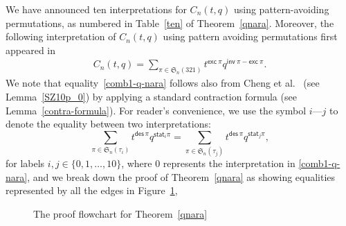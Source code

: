 \documentclass[12pt,reqno]{amsart}
\numberwithin{equation}{section}
\theoremstyle{plain}
\theoremstyle{definition}
\def\S{\mathfrak{S}}
\def\exc{\mathsf{exc}}
\def\des{\mathsf{des}}
\def\inv{\mathsf{inv}}
\def\stat{\mathsf{stat}}
\begin{document}
We have announced ten interpretations for $C_n(t,q)$ using pattern-avoiding permutations, as numbered in Table~\ref{ten} of Theorem~\ref{qnara}. Moreover, the following interpretation of $C_n(t,q)$ using pattern avoiding permutations first appeared in \cite{LF17}
\begin{align}\label{comb1-q-nara}
C_n(t,q)=\sum_{\pi\in\S_n(321)}t^{\exc\:\pi}q^{\inv\:\pi-\exc\:\pi}.
\end{align}
We note that equality~\eqref{comb1-q-nara} follows also from Cheng et al.~\cite[Theorem 7.3]{CEKS} (see Lemma~\ref{SZ10p_0}) by applying a standard contraction formula (see Lemma~\ref{contra-formula}).
For reader's convenience, we use the symbol $i$---$j$ to denote the equality between two interpretations:
$$
\sum_{\pi\in \S_n(\tau_i)}t^{\des\, \pi}q^{\stat_i \pi}=
\sum_{\pi\in \S_n(\tau_j)}t^{\des\, \pi}q^{\stat_j\pi},
$$
for labels $i,j\in\{0, 1, \ldots, 10\}$,
where 0 represents the interpretation  in \eqref{comb1-q-nara}, and
we break down the proof of Theorem~\ref{qnara} as showing equalities represented by all the edges in Figure~\ref{eleven},
\begin{figure}[htb]
\caption{The proof flowchart for Theorem~\ref{qnara}\label{eleven}}
\end{figure}
\end{document}
